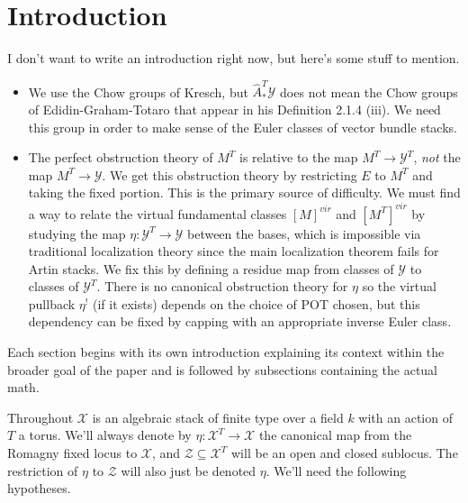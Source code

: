\section{Introduction}\label{rl-0001}

I don't want to write an introduction right now, but here's some stuff to mention.
\begin{itemize}
  \item We use the Chow groups of Kresch, but \(\hat A_*^T\mathcal Y\) does not mean the Chow groups of Edidin-Graham-Totaro that appear in his Definition 2.1.4 (iii). We need this group in order to make sense of the Euler classes of vector bundle stacks.
  \item The perfect obstruction theory of \(M^T\) is relative to the map \(M^T\to \mathcal Y^T\), \textit{not} the map \(M^T\to \mathcal Y\). We get this obstruction theory by restricting \(E\) to \(M^T\) and taking the fixed portion. This is the primary source of difficulty. We must find a way to relate the virtual fundamental classes \([M]^{vir}\) and \([M^T]^{vir}\) by studying the map \(\eta:\mathcal Y^T\to \mathcal Y\) between the bases, which is impossible via traditional localization theory since the main localization theorem fails for Artin stacks. We fix this by defining a residue map from classes of \(\mathcal Y\) to classes of \(\mathcal Y^T\). There is no canonical obstruction theory for \(\eta\) so the virtual pullback \(\eta^!\) (if it exists) depends on the choice of POT chosen, but this dependency can be fixed by capping with an appropriate inverse Euler class.
\end{itemize}

Each section begins with its own introduction explaining its context within the broader goal of the paper and is followed by subsections containing the actual math.

\bigskip

Throughout \(\mathcal X\) is an algebraic stack of finite type over a field \(k\) with an action of \(T\) a torus. We'll always denote by \(\eta:\mathcal X^T\to \mathcal X\) the canonical map from the Romagny fixed locus to \(\mathcal X\), and \(\mathcal Z\subseteq \mathcal X^T\) will be an open and closed sublocus. The restriction of \(\eta\) to \(\mathcal Z\) will also just be denoted \(\eta\). We'll need the following hypotheses.

